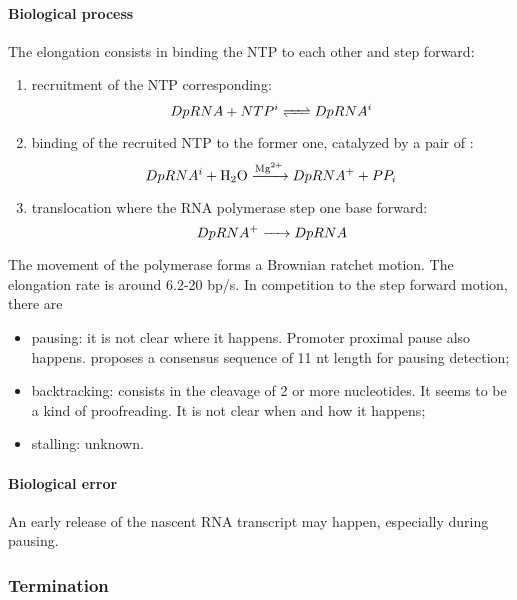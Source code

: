\paragraph{Biological process} The elongation consists in binding the NTP to each other and step forward:
\begin{enumerate}
  \item recruitment of the NTP corresponding:
    $$
      \reactionRev{DpRNA + NTP^i}{DpRNA^i}{}{} \\
    $$
  \item binding of the recruited NTP to the former one, catalyzed by a pair of :
    $$
      \reactionIrr{DpRNA^i + \ce{H2O}}{DpRNA^+ + PP_i}{\ce{Mg^2+}}{} \\
    $$
  \item translocation where the RNA polymerase step one base forward:
    $$
      \reactionIrr{DpRNA^+}{DpRNA}{}{} \\
    $$
\end{enumerate}
The movement of the polymerase forms a Brownian ratchet motion. The elongation rate is around 6.2-20 bp/s. In competition to the step forward motion, there are
\begin{itemize}
  \item pausing: it is not clear where it happens. Promoter proximal pause also happens. \citep{LaW+:14} proposes a consensus sequence of 11 nt length for pausing detection;
  \item backtracking: consists in the cleavage of 2 or more nucleotides. It seems to be a kind of proofreading. It is not clear when and how it happens;
  \item stalling: unknown.
\end{itemize}


\paragraph{Biological error} An early release of the nascent RNA transcript may happen, especially during pausing.


\subsubsection{Termination}
